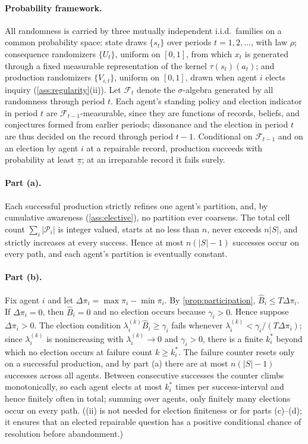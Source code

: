 \documentclass[11pt]{article}
\theoremstyle{definition}
\begin{document}
\paragraph{Probability framework.}
All randomness is carried by three mutually independent i.i.d.\ families on a common probability space: state draws $\{s_t\}$ over periods $t=1,2,\dots$, with law $\rho$; consequence randomizers $\{U_t\}$, uniform on $[0,1]$, from which $x_t$ is generated through a fixed measurable representation of the kernel $\tau(s_t)(a_t)$; and production randomizers $\{V_{i,t}\}$, uniform on $[0,1]$, drawn when agent $i$ elects inquiry (\cref{ass:regularity}(ii)).
Let $\mathcal F_t$ denote the $\sigma$-algebra generated by all randomness through period $t$.
Each agent's standing policy and election indicator in period $t$ are $\mathcal F_{t-1}$-measurable, since they are functions of records, beliefs, and conjectures formed from earlier periods; dissonance and the election in period $t$ are thus decided on the record through period $t-1$.
Conditional on $\mathcal F_{t-1}$ and on an election by agent $i$ at a repairable record, production succeeds with probability at least $\underline\pi$; at an irreparable record it fails surely.

\paragraph{Part (a).}
Each successful production strictly refines one agent's partition, and, by cumulative awareness (\cref{ass:elective}), no partition ever coarsens.
The total cell count $\sum_i\lvert\mathcal P_i\rvert$ is integer valued, starts at no less than $n$, never exceeds $n\lvert S\rvert$, and strictly increases at every success.
Hence at most $n(\lvert S\rvert-1)$ successes occur on every path, and each agent's partition is eventually constant.

\paragraph{Part (b).}
Fix agent $i$ and let $\Delta \pi_i=\max \pi_i-\min \pi_i$.
By \cref{prop:participation}, $\widehat B_i\leq T\Delta \pi_i$.
If $\Delta \pi_i=0$, then $\widehat B_i=0$ and no election occurs because $\gamma_i>0$.
Hence suppose $\Delta \pi_i>0$.
The election condition $\lambda_i^{(k)}\widehat B_i\geq\gamma_i$ fails whenever $\lambda_i^{(k)}<\gamma_i/(T\Delta \pi_i)$; since $\lambda_i^{(k)}$ is nonincreasing with $\lambda_i^{(k)}\to0$ and $\gamma_i>0$, there is a finite $k_i^{*}$ beyond which no election occurs at failure count $k\geq k_i^{*}$.
The failure counter resets only on a successful production, and by part (a) there are at most $n(\lvert S\rvert-1)$ successes across all agents.
Between consecutive successes the counter climbs monotonically, so each agent elects at most $k_i^{*}$ times per success-interval and hence finitely often in total; summing over agents, only finitely many elections occur on every path.
((ii) is not needed for election finiteness or for parts (c)--(d); it ensures that an elected repairable question has a positive conditional chance of resolution before abandonment.)
\end{document}
